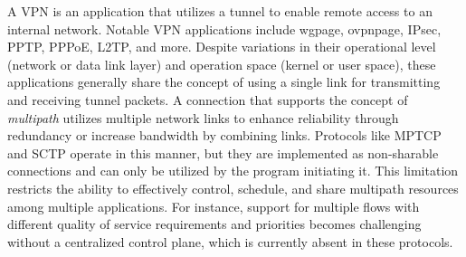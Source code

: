 A \ac{VPN} is an application that utilizes a tunnel to enable remote access to an internal network. 
Notable \ac{VPN} applications include \ac{wgpage}, \ac{ovpnpage}, IPsec, PPTP, PPPoE, L2TP, and more. 
Despite variations in their operational level (network or data link layer) and operation space (kernel or user space), these applications generally share the concept of using a single link for transmitting and receiving tunnel packets.
A connection that supports the concept of \textit{multipath} utilizes multiple network links to enhance reliability through redundancy or increase bandwidth by combining links. 
Protocols like \ac{MPTCP} and \ac{SCTP} operate in this manner, but they are implemented as non-sharable connections and can only be utilized by the program initiating it. 
This limitation restricts the ability to effectively control, schedule, and share multipath resources among multiple applications. 
For instance, support for multiple flows with different quality of service requirements and priorities becomes challenging without a centralized control plane, which is currently absent in these protocols.
\\

